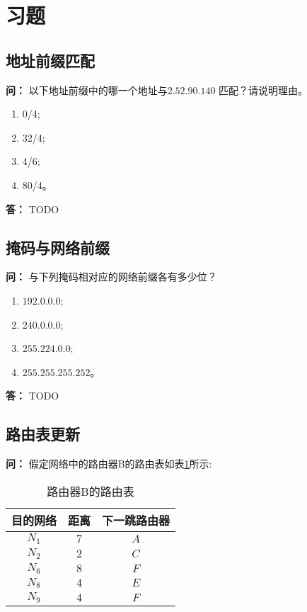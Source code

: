 \documentclass[12pt,hyperref,a4paper,UTF8]{ctexart}
\begin{document}
\newpage

\section{习题}

\subsection{地址前缀匹配}
\textbf{问：}
以下地址前缀中的哪一个地址与$2.52.90.140$ 匹配？请说明理由。
\begin{enumerate}[label=\Roman*),leftmargin=2.2\parindent]
    \item 0/4; 
    \item 32/4; 
    \item 4/6; 
    \item 80/4。
\end{enumerate}

\textbf{答：}
TODO

\subsection{掩码与网络前缀}
\textbf{问：}
与下列掩码相对应的网络前缀各有多少位？
\begin{enumerate}[label=\Roman*),leftmargin=2.2\parindent]
    \item $192.0.0.0$;
    \item $240.0.0.0$;
    \item $255.224.0.0$;
    \item $255.255.255.252$。
\end{enumerate}

\textbf{答：}
TODO

\subsection{路由表更新}
\textbf{问：}
假定网络中的路由器B的路由表如表\ref{tab:router_b}所示:
\begin{table}[h!]
    \centering
    \caption{路由器B的路由表}
    \begin{tabular}{c|c|c}
    \toprule
    目的网络 & 距离 & 下一跳路由器\\
    \midrule
    $N_1$ & $7$ & $A$\\
    $N_2$ & $2$ & $C$\\
    $N_6$ & $8$ & $F$\\
    $N_8$ & $4$ & $E$\\
    $N_9$ & $4$ & $F$\\
    \bottomrule
    \end{tabular}
    \label{tab:router_b}
\end{table}
\end{document}
